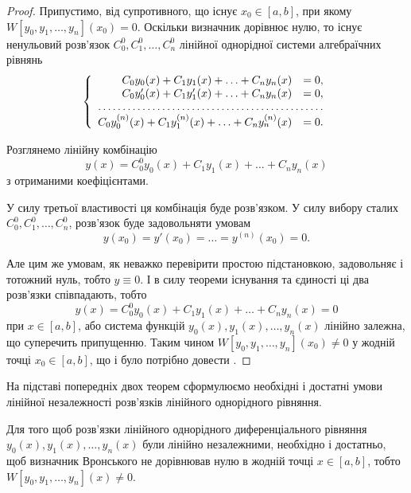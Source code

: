 \begin{proof}
	Припустимо, від супротивного, що існує $x_0 \in [a,b]$, при якому $W[y_0, y_1, \ldots, y_n](x_0) = 0$. Оскільки визначник дорівнює нулю, то існує ненульовий розв'язок $C_0^0, C_1^0, \ldots, C_n^0$ лінійної однорідної системи алгебраїчних рівнянь \begin{equation*}
		\left\{ \begin{array}{rl}
			C_0 y_0(x) + C_1 y_1(x) + \ldots + C_n y_n(x) &= 0, \\
			C_0 y_0'(x) + C_1 y_1'(x) + \ldots + C_n y_n(x) &= 0, \\
			\hdotsfor{2} \\
			C_0 y_0^{(n)}(x) + C_1 y_1^{(n)}(x) + \ldots + C_n y_n^{(n)}(x) &= 0.
		\end{array} \right.
	\end{equation*}
	
	Розглянемо лінійну комбінацію 
	\begin{equation*}
		y(x) = C_0^0 y_0(x) + C_1 y_1(x) + \ldots + C_n y_n(x)
	\end{equation*}
	з отриманими коефіцієнтами. \parvskip

	У силу третьої властивості ця комбінація буде розв'язком. У силу вибору сталих $C_0^0, C_1^0, \ldots, C_n^0$, розв'язок буде задовольняти умовам
	\begin{equation*}
		y(x_0) = y'(x_0) = \ldots = y^{(n)}(x_0) = 0.
	\end{equation*}
 
	Але цим же умовам, як неважко перевірити простою підстановкою, задовольняє і тотожний нуль, тобто $y \equiv 0$. І в силу теореми існування та єдиності ці два розв'язки співпадають, тобто 
	\begin{equation*}
		y(x) = C_0^0 y_0(x) + C_1 y_1(x) + \ldots + C_n y_n(x) = 0
	\end{equation*}
	при $x \in [a,b]$, або система функцій $y_0(x), y_1(x), \ldots, y_n(x)$ лінійно залежна, що суперечить припущенню. Таким чином $W[y_0, y_1, \ldots, y_n](x_0) \ne 0$ у жодній точці $x_0 \in [a,b]$, що і було потрібно довести .
\end{proof}

На підставі попередніх двох теорем сформулюємо необхідні і достатні умови лінійної незалежності розв'язків лінійного однорідного рівняння.

\begin{theorem}
	Для того щоб розв'язки лінійного однорідного диференціального рівняння $y_0(x), y_1(x), \ldots, y_n(x)$ були лінійно незалежними, необхідно і достатньо, щоб визначник Вронського не дорівнював нулю в жодній точці $x \in [a,b]$, тобто $W[y_0, y_1, \ldots, y_n](x) \ne 0$.
\end{theorem}

